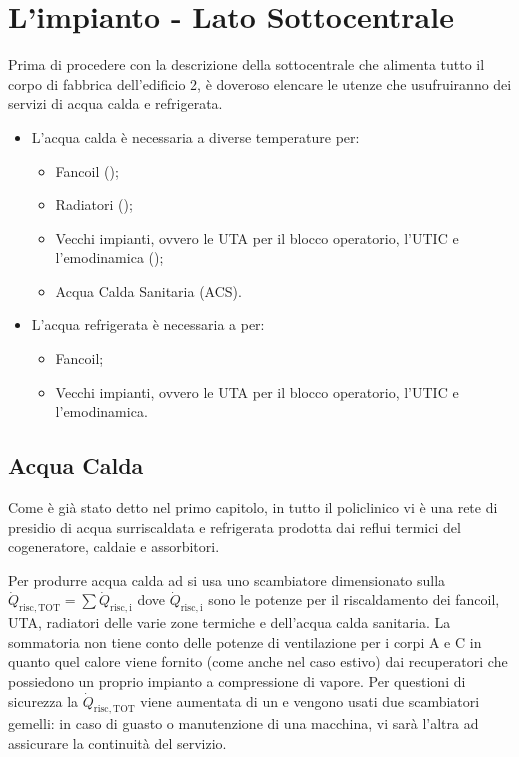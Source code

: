 
\section{L'impianto - Lato Sottocentrale}
Prima di procedere con la descrizione della sottocentrale che alimenta tutto il corpo di fabbrica dell'edificio 2, è doveroso elencare le utenze che usufruiranno dei servizi di acqua calda e refrigerata.
\begin{itemize}
	\item L'acqua calda è necessaria a diverse temperature per:
	\begin{itemize}
		\item Fancoil ();
		\item Radiatori ();
		\item Vecchi impianti, ovvero le UTA per il blocco operatorio, l'UTIC e l'emodinamica ();
		\item Acqua Calda Sanitaria (ACS).
	\end{itemize}
	\item L'acqua refrigerata è necessaria a  per:
	\begin{itemize}
		\item Fancoil;
		\item Vecchi impianti, ovvero le UTA per il blocco operatorio, l'UTIC e l'emodinamica.
	\end{itemize}
\end{itemize}
\subsection{Acqua Calda}
Come è già stato detto nel primo capitolo, in tutto il policlinico vi è una rete di presidio di acqua surriscaldata e refrigerata prodotta dai reflui termici del cogeneratore, caldaie e assorbitori. 

Per produrre acqua calda ad  si usa uno scambiatore dimensionato sulla $\dot{Q}_{\mathrm{risc,TOT}} = \sum \dot{Q}_{\mathrm{risc,i}}$ dove $\dot{Q}_{\mathrm{risc,i}}$ sono le potenze per il riscaldamento dei fancoil, UTA, radiatori delle varie zone termiche e dell'acqua calda sanitaria. La sommatoria non tiene conto delle potenze di ventilazione per i corpi A e C in quanto quel calore viene fornito (come anche nel caso estivo) dai recuperatori che possiedono un proprio impianto a compressione di vapore. Per questioni di sicurezza la $\dot{Q}_{\mathrm{risc,TOT}}$ viene aumentata di un  e vengono usati due scambiatori gemelli: in caso di guasto o manutenzione di una macchina, vi sarà l'altra ad assicurare la continuità del servizio.

